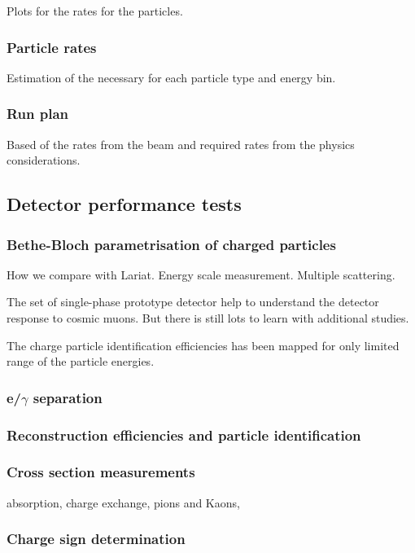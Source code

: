 Plots for the  rates for the particles.
\subsubsection{Particle rates}
Estimation of the necessary for each particle type and energy bin. 
\subsubsection {Run plan}
Based of the rates from the beam and required rates from the physics considerations.




\subsection{Detector performance tests}

\subsubsection{Bethe-Bloch parametrisation of charged particles}
How we compare with Lariat. Energy scale measurement. 
Multiple scattering.  

The set of single-phase prototype detector help to understand the detector response to cosmic muons. But there is still lots to learn with additional studies. 

The charge  particle identification efficiencies  has been mapped for only limited range of the particle energies.  

\subsubsection{e/$\gamma$ separation}
\subsubsection{Reconstruction efficiencies and particle identification}



\subsubsection{Cross section measurements}
absorption, charge exchange, pions and Kaons, 
\subsubsection{Charge sign determination}

